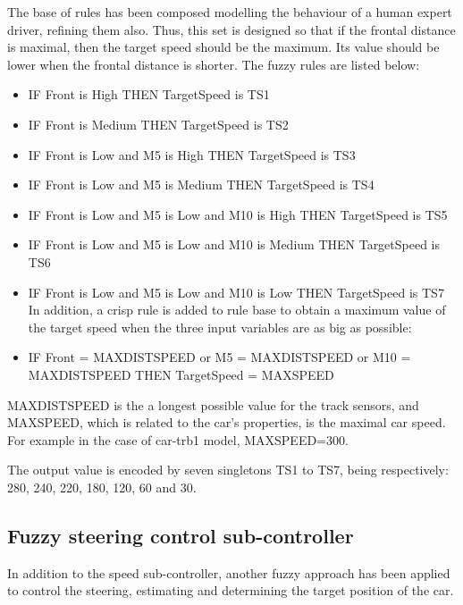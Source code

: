 \documentclass[runningheads,a4paper]{llncs}
\begin{document}
	The base of rules has been composed modelling the behaviour of a human expert driver, refining them also. Thus, this set is designed so that if the frontal distance is maximal, then the target speed should be the maximum. Its value should be lower when the frontal distance is shorter. 
	The fuzzy rules are listed below:
	
	\begin{itemize}
		\item IF Front is High THEN TargetSpeed is TS1
		\item IF Front is Medium THEN TargetSpeed is TS2
		\item IF Front is Low and M5 is High THEN TargetSpeed is TS3
		\item IF Front is Low and M5 is Medium THEN TargetSpeed is TS4
		\item IF Front is Low and M5 is Low and M10 is High THEN TargetSpeed is TS5
		\item IF Front is Low and M5 is Low and M10 is Medium THEN TargetSpeed is TS6
		\item IF Front is Low and M5 is Low and M10 is Low THEN TargetSpeed is TS7\\
		
		In addition, a crisp rule is added to rule base to obtain a maximum value of the target speed when the three input variables are as big as possible: 
		\item IF Front = MAXDISTSPEED or M5 = MAXDISTSPEED or M10 = MAXDISTSPEED THEN TargetSpeed = MAXSPEED		
	\end{itemize}
	
	MAXDISTSPEED is the a longest possible value for the track sensors, and MAXSPEED, which is related to the car's properties, is the maximal car speed. For example in the case of car-trb1 model, MAXSPEED=300.
	
	The output value is encoded by seven singletons TS1 to TS7, being respectively: 280, 240, 220, 180, 120, 60 and 30.
	
	
	\subsection{Fuzzy steering control sub-controller}	
	
	In addition to the speed sub-controller, another fuzzy approach has been applied to control the steering, estimating and determining the target position of the car. 
	
\end{document}
